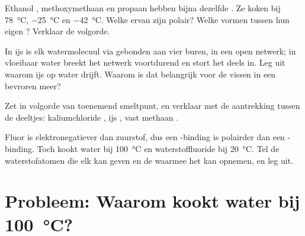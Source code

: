 \begin{exercise}[$\star\star\star$]\label{exo:g11:polarity-and-cohesion:12}
Ethanol , methoxymethaan  en propaan
 hebben bijna dezelfde . Ze koken bij
\qty{78}{\celsius}, \qty{-25}{\celsius} en \qty{-42}{\celsius}. Welke
ervan zijn polair? Welke vormen  tussen hun eigen
? Verklaar de volgorde.
\end{exercise}

\begin{exercise}[$\star\star\star$]\label{exo:g11:polarity-and-cohesion:13}
In ijs is elk watermolecuul via  gebonden aan vier buren,
in een open netwerk; in vloeibaar water breekt het netwerk voortdurend en
stort het deels in. Leg uit waarom ijs op water drijft. Waarom is dat
belangrijk voor de vissen in een bevroren meer?
\end{exercise}

\begin{exercise}[$\star\star\star$]\label{exo:g11:polarity-and-cohesion:14}
Zet in volgorde van toenemend smeltpunt, en verklaar met de aantrekking
tussen de deeltjes: kaliumchloride , ijs , vast methaan
.
\end{exercise}

\begin{exercise}[$\star\star\star$]\label{exo:g11:polarity-and-cohesion:15}
Fluor is elektronegatiever dan zuurstof, dus een -binding is
polairder dan een -binding. Toch kookt water bij
\qty{100}{\celsius} en waterstoffluoride bij \qty{20}{\celsius}. Tel de
waterstofatomen die elk  kan geven en de 
waarmee het kan opnemen, en leg uit.
\end{exercise}

\section{Probleem: Waarom kookt water bij \texorpdfstring{\qty{100}{\celsius}}{100 graden Celsius}?}

